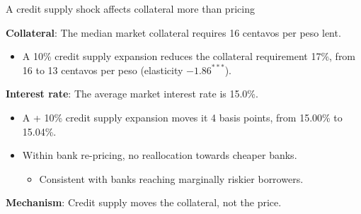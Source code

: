 \documentclass[aspectratio=169]{beamer}
\begin{document}
\begin{frame}{A credit supply shock affects collateral more than pricing}

\textbf{Collateral}: The median market collateral requires 16 centavos per peso lent.
\begin{itemize}
    \item A 10\% credit supply expansion reduces the collateral requirement 17\%, from 16 to 13 centavos per peso (elasticity $-1.86^{***}$).
\end{itemize}

\pause
\vspace{5mm}

\textbf{Interest rate}: The average market interest rate is 15.0\%.
\begin{itemize}
    \item A + 10\% credit supply expansion moves it 4 basis points, from 15.00\% to 15.04\%.
    \item Within bank re-pricing, no reallocation towards cheaper banks.
    \begin{itemize}
        \item Consistent with banks reaching marginally riskier borrowers.
    \end{itemize}
\end{itemize}

\vspace{5mm}
\pause

\begin{center}
    \large \textbf{Mechanism}: Credit supply moves the collateral, not the price.
\end{center}

\end{frame}

\end{document}
